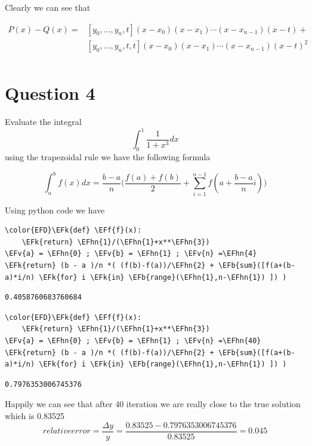 \documentclass[11pt]{article}
\newcommand{\EFk}[1]{\textcolor{EFk}{#1}} %
\newcommand{\EFb}[1]{\textcolor{EFb}{#1}} %
\newcommand{\EFf}[1]{\textcolor{EFf}{#1}} %
\newcommand{\EFv}[1]{\textcolor{EFv}{#1}} %
\newcommand{\EFhn}[1]{\textcolor{EFhn}{#1}} %
\begin{document}
Clearly we can see that

\begin{align*}
P(x) - Q(x)  =
& [y_0,\ldots,y_n , t](x-x_0)(x-x_1)\cdots(x-x_{n-1})(x-t) + \\
& [y_0,\ldots,y_n,t,t](x-x_0)(x-x_1)\cdots(x-x_{n-1})(x-t)^2 \\
\end{align*}



\newpage
\section{Question 4}
\label{sec:org14358a2}
Evaluate the integral
\[ \int _{0}^{1}\frac{1}{1+x^{3}} dx \]
using the trapezoidal rule we have the following formula

\[ \int_{a}^{b} f(x)dx = \frac{b-a}{n}\big( \frac{f(a)+f(b)}{2} + \sum_{i=1}^{n-1}f(a+\frac{b-a}{n}i) \big) \]

Using python code we have
\begin{Code}
\begin{Verbatim}
\color{EFD}\EFk{def} \EFf{f}(x):
    \EFk{return} \EFhn{1}/(\EFhn{1}+x**\EFhn{3})
\EFv{a} = \EFhn{0} ; \EFv{b} = \EFhn{1} ; \EFv{n} =\EFhn{4}
\EFk{return} (b - a )/n *( (f(b)-f(a))/\EFhn{2} + \EFb{sum}([f(a+(b-a)*i/n) \EFk{for} i \EFk{in} \EFb{range}(\EFhn{1},n-\EFhn{1}) ]) )

\end{Verbatim}
\end{Code}

\begin{verbatim}
0.4058760683760684
\end{verbatim}


\begin{Code}
\begin{Verbatim}
\color{EFD}\EFk{def} \EFf{f}(x):
    \EFk{return} \EFhn{1}/(\EFhn{1}+x**\EFhn{3})
\EFv{a} = \EFhn{0} ; \EFv{b} = \EFhn{1} ; \EFv{n} =\EFhn{40}
\EFk{return} (b - a )/n *( (f(b)-f(a))/\EFhn{2} + \EFb{sum}([f(a+(b-a)*i/n) \EFk{for} i \EFk{in} \EFb{range}(\EFhn{1},n-\EFhn{1}) ]) )

\end{Verbatim}
\end{Code}

\begin{verbatim}
0.7976353006745376
\end{verbatim}


Happily we can see that after 40 iteration we are really close to the true solution which is 0.83525
\[ relative error = \frac{\Delta y}{y} = \frac{0.83525 - 0.7976353006745376}{0.83525}= 0.045 \]
\end{document}
